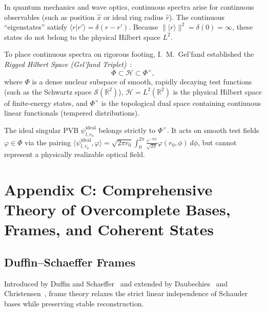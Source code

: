 \documentclass{optica-article}
\begin{document}
In quantum mechanics and wave optics, continuous spectra arise for continuous observables (such as position $\hat{x}$ or ideal ring radius $\hat{r}$). The continuous ``eigenstates'' satisfy $\langle r | r' \rangle = \delta(r - r')$. Because $\||r\rangle\|^2 = \delta(0) = \infty$, these states do not belong to the physical Hilbert space $L^2$.

To place continuous spectra on rigorous footing, I.~M.~Gel'fand established the \emph{Rigged Hilbert Space (Gel'fand Triplet)}~\cite{Gelfand1964,Bohm1989}:
\begin{equation}
\Phi \subset \mathcal{H} \subset \Phi^\times,
\end{equation}
where $\Phi$ is a dense nuclear subspace of smooth, rapidly decaying test functions (such as the Schwartz space $\mathcal{S}(\mathbb{R}^2)$), $\mathcal{H} = L^2(\mathbb{R}^2)$ is the physical Hilbert space of finite-energy states, and $\Phi^\times$ is the topological dual space containing continuous linear functionals (tempered distributions).

The ideal singular PVB $\psi_{l, r_0}^{\text{ideal}}$ belongs strictly to $\Phi^\times$. It acts on smooth test fields $\varphi \in \Phi$ via the pairing $\langle \psi_{l, r_0}^{\text{ideal}}, \varphi \rangle = \sqrt{2\pi r_0} \int_0^{2\pi} \frac{e^{-i l \phi}}{\sqrt{2\pi}} \varphi(r_0, \phi) \, d\phi$, but cannot represent a physically realizable optical field.

\section{Appendix C: Comprehensive Theory of Overcomplete Bases, Frames, and Coherent States}
\label{app:frames}

\subsection{Duffin--Schaeffer Frames}

Introduced by Duffin and Schaeffer~\cite{Duffin1952} and extended by Daubechies~\cite{Daubechies1990} and Christensen~\cite{Christensen2016}, frame theory relaxes the strict linear independence of Schauder bases while preserving stable reconstruction.
\end{document}
